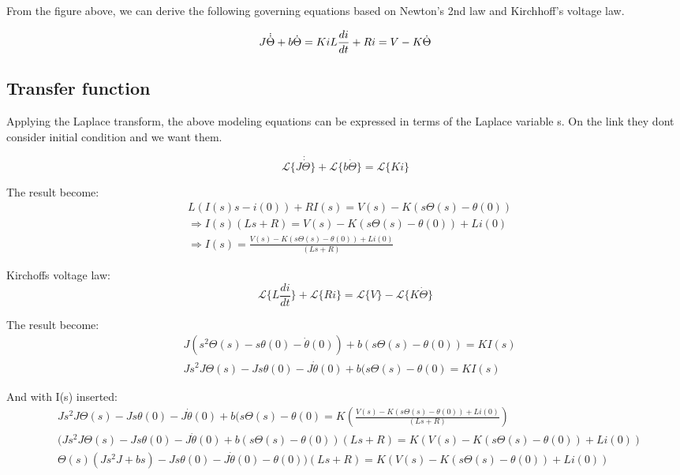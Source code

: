 From the figure above, we can derive the following governing equations based on Newton's 2nd law and Kirchhoff's voltage law.

\begin{equation}
	J \dot{\dot{\Theta}} + b\dot{\Theta} = Ki \\
	L\frac{di}{dt} + Ri = V - K\dot{\Theta}
\end{equation}

\subsection{Transfer function}
Applying the Laplace transform, the above modeling equations can be expressed in terms of the Laplace variable s. On the link they dont consider initial condition and we want them.

\begin{equation}
	\mathscr{L}\{J \dot{\dot{\Theta}}\}  + \mathscr{L}\{b\dot{\Theta}\} = \mathscr{L}\{Ki\}
\end{equation}

The result become:
\begin{align*}
	& L(I(s)s-i(0)) + RI(s) = V(s) - K(s\Theta (s) - \theta (0)) \\
	& \Rightarrow I(s)(Ls+R) = V(s) - K(s\Theta (s) - \theta (0)) +Li(0) \\
	& \Rightarrow I(s) = \frac{V(s) - K(s\Theta (s) - \theta (0)) +Li(0)}{(Ls+R)}
\end{align*}

Kirchoffs voltage law:
\begin{equation*}
	\mathscr{L}\{L\frac{di}{dt}\} + \mathscr{L}\{Ri\} = \mathscr{L}\{V\} - \mathscr{L}\{K\dot{\Theta}\}
\end{equation*}

The result become:
\begin{align*}
	& J(s^2 \Theta(s) - s\theta (0) - \dot{\theta} (0)) +b(s\Theta (s)-\theta (0)) = KI(s) \\
	& Js^2 J\Theta(s) - Js\theta (0) - J\dot{\theta} (0) +b(s\Theta (s)-\theta (0) = KI(s) 
\end{align*}

And with I(s) inserted:
\begin{align*}
	& Js^2 J\Theta(s) - Js\theta (0) - J\dot{\theta} (0) +b(s\Theta (s)-\theta (0) = K (\frac{V(s) - K(s\Theta (s) - \theta (0)) +Li(0)}{(Ls+R)}) \\
	& (Js^2 J\Theta(s) - Js\theta (0) - J\dot{\theta} (0) +b(s\Theta (s)-\theta (0))(Ls+R) =  K(V(s) - K(s\Theta (s) - \theta (0)) +Li(0)) \\
	& \Theta(s)(Js^2 J +bs) - Js\theta (0) - J\dot{\theta} (0) -\theta (0))(Ls+R) =  K(V(s) - K(s\Theta (s) - \theta (0)) +Li(0))
\end{align*}

